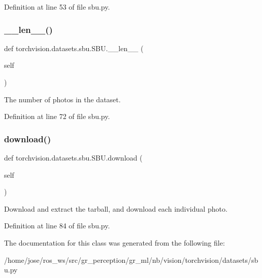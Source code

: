 Definition at line 53 of file sbu.\+py.

\mbox{\label{classtorchvision_1_1datasets_1_1sbu_1_1SBU_a38bb2b1d57f2d97f386046d7525e108d}} 
\subsubsection{\texorpdfstring{\+\_\+\+\_\+len\+\_\+\+\_\+()}{\_\_len\_\_()}}
{\footnotesize\ttfamily def torchvision.\+datasets.\+sbu.\+S\+B\+U.\+\_\+\+\_\+len\+\_\+\+\_\+ (\begin{DoxyParamCaption}\item[{}]{self }\end{DoxyParamCaption})}

\begin{DoxyVerb}The number of photos in the dataset.\end{DoxyVerb}
 

Definition at line 72 of file sbu.\+py.

\mbox{\label{classtorchvision_1_1datasets_1_1sbu_1_1SBU_ab9cb0b9c60d1b93477910b4263803e25}} 
\subsubsection{\texorpdfstring{download()}{download()}}
{\footnotesize\ttfamily def torchvision.\+datasets.\+sbu.\+S\+B\+U.\+download (\begin{DoxyParamCaption}\item[{}]{self }\end{DoxyParamCaption})}

\begin{DoxyVerb}Download and extract the tarball, and download each individual photo.\end{DoxyVerb}
 

Definition at line 84 of file sbu.\+py.



The documentation for this class was generated from the following file\+:\begin{DoxyCompactItemize}
\item 
/home/jose/ros\+\_\+ws/src/gr\+\_\+perception/gr\+\_\+ml/nb/vision/torchvision/datasets/sbu.\+py\end{DoxyCompactItemize}
